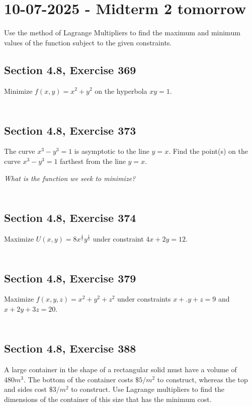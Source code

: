 \documentclass[]{mangos-musings}
\begin{document}
\newpage
\section{10-07-2025 - Midterm 2 tomorrow}
Use the method of Lagrange Multipliers to find the maximum and minimum values of the function subject to the given constraints.
\subsection{Section 4.8, Exercise 369}
Minimize $f(x, y) = x^2 + y^2$ on the hyperbola $xy = 1$.
\begin{align*}
  \\ \\ \\
\end{align*}
\subsection{Section 4.8, Exercise 373}
The curve $x^3 - y^3 = 1$ is asymptotic to the line  $y = x$. 
Find the point(s) on the curve $x^3 - y^3 = 1$ 
farthest from the line $y = x$.

\textit{What is the function we seek to minimize?}
\begin{align*}
  \\ \\ \\
\end{align*}
\newpage
\subsection{Section 4.8, Exercise 374}
Maximize $U(x, y) = 8x^{\frac{4}{5}} y^{\frac{1}{5}}$ under constraint $4x + 2y = 12$.
\begin{align*}
  \\ \\ \\
\end{align*}
\subsection{Section 4.8, Exercise 379}
Maximize $f(x, y, z) = x^2 + y^2 + z^2$ under constraints $x +.y + z = 9$ and $x + 2y + 3z = 20$.
\begin{align*}
  \\ \\ \\
\end{align*}
\subsection{Section 4.8, Exercise 388}
A large container in the shape of a rectangular solid must have a volume of $480 m^3$. The bottom of the container costs $\$5/m^2$ to construct, whereas the top and sides cost $\$3 /m^2$ to construct. Use Lagrange multipliers to find the dimensions of the container of this size that has the minimum cost.
\end{document}
